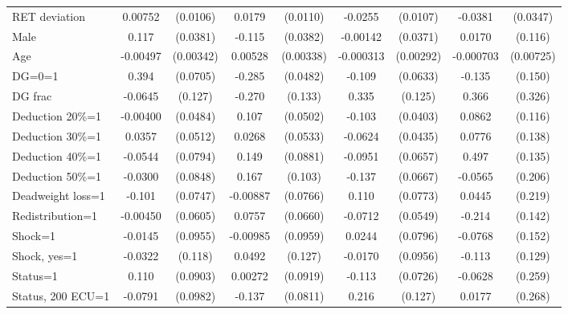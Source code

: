 \begin{tabular}{l|cccccc|cc}
RET deviation   &  0.00752         & (0.0106)&   0.0179         & (0.0110)&  -0.0255\sym{**} & (0.0107)&  -0.0381         & (0.0347)\\
Male            &    0.117\sym{***}& (0.0381)&   -0.115\sym{***}& (0.0382)& -0.00142         & (0.0371)&   0.0170         &  (0.116)\\
Age             & -0.00497         &(0.00342)&  0.00528         &(0.00338)&-0.000313         &(0.00292)&-0.000703         &(0.00725)\\
DG=0=1          &    0.394\sym{***}& (0.0705)&   -0.285\sym{***}& (0.0482)&   -0.109\sym{*}  & (0.0633)&   -0.135         &  (0.150)\\
DG frac         &  -0.0645         &  (0.127)&   -0.270\sym{**} &  (0.133)&    0.335\sym{***}&  (0.125)&    0.366         &  (0.326)\\
Deduction 20\%=1& -0.00400         & (0.0484)&    0.107\sym{**} & (0.0502)&   -0.103\sym{**} & (0.0403)&   0.0862         &  (0.116)\\
Deduction 30\%=1&   0.0357         & (0.0512)&   0.0268         & (0.0533)&  -0.0624         & (0.0435)&   0.0776         &  (0.138)\\
Deduction 40\%=1&  -0.0544         & (0.0794)&    0.149\sym{*}  & (0.0881)&  -0.0951         & (0.0657)&    0.497\sym{***}&  (0.135)\\
Deduction 50\%=1&  -0.0300         & (0.0848)&    0.167         &  (0.103)&   -0.137\sym{**} & (0.0667)&  -0.0565         &  (0.206)\\
Deadweight loss=1&   -0.101         & (0.0747)& -0.00887         & (0.0766)&    0.110         & (0.0773)&   0.0445         &  (0.219)\\
Redistribution=1& -0.00450         & (0.0605)&   0.0757         & (0.0660)&  -0.0712         & (0.0549)&   -0.214         &  (0.142)\\
Shock=1         &  -0.0145         & (0.0955)& -0.00985         & (0.0959)&   0.0244         & (0.0796)&  -0.0768         &  (0.152)\\
Shock, yes=1    &  -0.0322         &  (0.118)&   0.0492         &  (0.127)&  -0.0170         & (0.0956)&   -0.113         &  (0.129)\\
Status=1        &    0.110         & (0.0903)&  0.00272         & (0.0919)&   -0.113         & (0.0726)&  -0.0628         &  (0.259)\\
Status, 200 ECU=1&  -0.0791         & (0.0982)&   -0.137\sym{*}  & (0.0811)&    0.216\sym{*}  &  (0.127)&   0.0177         &  (0.268)\\

\end{tabular}
